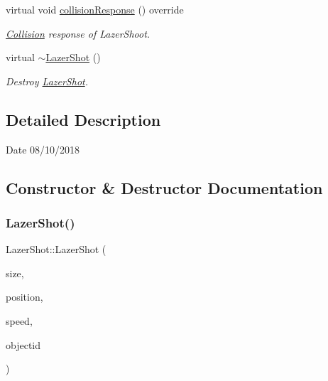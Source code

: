 \begin{DoxyCompactItemize}
\mbox{\label{class_lazer_shot_a890ffaf8ff5af439e67c33805f7a7b06}} 
virtual void \mbox{\hyperlink{class_lazer_shot_a890ffaf8ff5af439e67c33805f7a7b06}{collision\+Response}} () override
\begin{DoxyCompactList}\small\item\em \mbox{\hyperlink{class_collision}{Collision}} response of Lazer\+Shoot. \end{DoxyCompactList}\item 
\mbox{\label{class_lazer_shot_a67497615bb40710e312817d500f78b1e}} 
virtual \mbox{\hyperlink{class_lazer_shot_a67497615bb40710e312817d500f78b1e}{$\sim$\+Lazer\+Shot}} ()
\begin{DoxyCompactList}\small\item\em Destroy \mbox{\hyperlink{class_lazer_shot}{Lazer\+Shot}}. \end{DoxyCompactList}\end{DoxyCompactItemize}


\subsection{Detailed Description}
\begin{DoxyDate}{Date}
08/10/2018 
\end{DoxyDate}


\subsection{Constructor \& Destructor Documentation}
\mbox{\label{class_lazer_shot_a16416eaac233433aae4e95edb48b129d}} 
\subsubsection{\texorpdfstring{Lazer\+Shot()}{LazerShot()}}
{\footnotesize\ttfamily Lazer\+Shot\+::\+Lazer\+Shot (\begin{DoxyParamCaption}\item[{const \mbox{\hyperlink{classvector2_d}{vector2D}} \&}]{size,  }\item[{const \mbox{\hyperlink{classvector2_d}{vector2D}} \&}]{position,  }\item[{float}]{speed,  }\item[{Object\+ID}]{objectid }\end{DoxyParamCaption})\hspace{0.3cm}{\ttfamily [inline]}}



